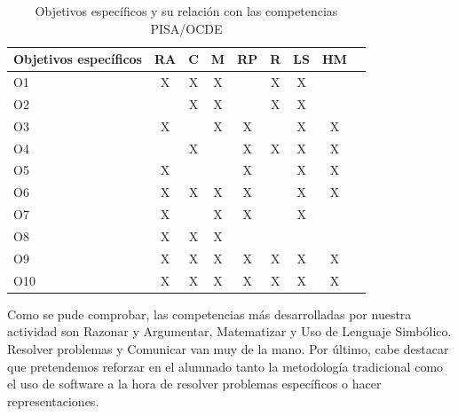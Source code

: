 \documentclass[../main.tex]{memoir}
\begin{document}
\begin{table}[H]
	\centering
	\begin{tabular}{lcccccccc}
		\hline
		\toprule
		\textbf{Objetivos específicos} & \textbf{RA} & \textbf{C} & \textbf{M} & \textbf{RP} & \textbf{R} & \textbf{LS} & \textbf{HM} \\ 
		\midrule
		O1                             & X           & X          & X          &             & X          & X           &             \\ \hline
		O2                             &             & X          & X          &             & X          & X           &             \\ \hline
		O3                             & X           &            & X          & X           &            & X           & X           \\ \hline
		O4                             &             & X          &           & X           & X          & X           & X           \\ \hline
		O5                             & X           &            &          & X           &            & X           & X           \\ \hline
		O6                             & X           & X          & X          & X           &            & X           & X           \\ \hline
		O7                             & X           &            & X          & X           &            & X           &             \\ \hline
		O8                             & X           & X          & X          &             &            &             &             \\ \hline
		O9                             & X           & X          & X          & X           & X          & X           & X           \\ \hline
		O10							   & X           & X          & X          & X           & X          & X           & X           \\
		\bottomrule
	\end{tabular}
	\caption{Objetivos específicos y su relación con las competencias PISA/OCDE}
	\label{tab:obj-pisa}
\end{table}

Como se pude comprobar, las competencias más desarrolladas por nuestra actividad son Razonar y Argumentar, Matematizar y Uso de Lenguaje Simbólico. Resolver problemas y Comunicar van muy de la mano. Por último, cabe destacar que pretendemos reforzar en el alumnado tanto la metodología tradicional como el uso de software a la hora de resolver problemas específicos o hacer representaciones.
\end{document}
